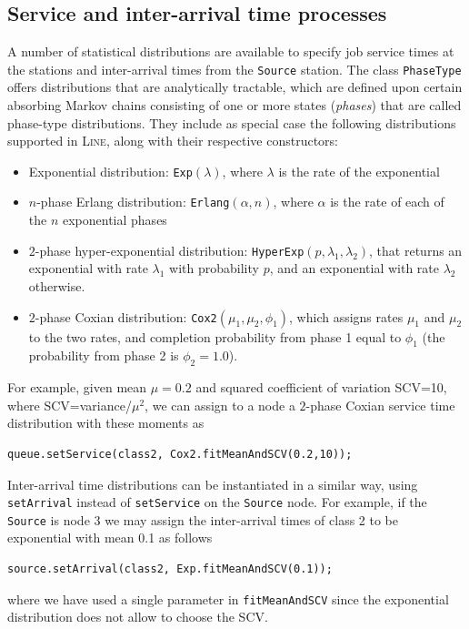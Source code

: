 \subsection{Service and inter-arrival time processes}
\label{service-and-inter-arrival-time-processes}
A number of statistical distributions are available to specify job service times at the stations and inter-arrival times from the \texttt{Source} station. The class \texttt{PhaseType} offers distributions that are analytically tractable, which are defined upon certain absorbing Markov chains consisting of one or more states ({\em phases}) that are called phase-type distributions. They include as special case the following distributions supported in \textsc{Line}, along with their respective constructors:
\begin{itemize}
\item Exponential distribution: \texttt{Exp}$(\lambda)$, where $\lambda$ is the rate of the exponential
\item $n$-phase Erlang distribution: \texttt{Erlang}$(\alpha, n)$, where $\alpha$ is the rate of each of the $n$ exponential phases
\item $2$-phase hyper-exponential distribution: \texttt{HyperExp}$(p,\lambda_1,\lambda_2)$, that returns an exponential with rate $\lambda_1$ with probability $p$, and  an exponential with rate $\lambda_2$ otherwise.
\item $2$-phase Coxian distribution: \texttt{Cox2}$(\mu_1,\mu_2,\phi_1)$, which assigns rates $\mu_1$ and $\mu_2$ to the two rates, and completion probability from phase 1 equal to $\phi_1$ (the probability from phase 2 is $\phi_2=1.0$).
\end{itemize}
For example, given mean $\mu=0.2$ and squared coefficient of variation SCV=10, where SCV=variance/$\mu^2$, we can assign to a node a $2$-phase Coxian service time distribution with these moments as
\begin{lstlisting}
queue.setService(class2, Cox2.fitMeanAndSCV(0.2,10));
\end{lstlisting}
Inter-arrival time distributions can be instantiated in a similar way, using \texttt{setArrival} instead of \texttt{setService} on the \texttt{Source} node. For example, if the \texttt{Source} is node 3 we may assign the inter-arrival times of class 2 to be exponential with mean 0.1 as follows
\begin{lstlisting}
source.setArrival(class2, Exp.fitMeanAndSCV(0.1));
\end{lstlisting}
where we have used a single parameter in \texttt{fitMeanAndSCV} since the exponential distribution does not allow to choose the SCV.

